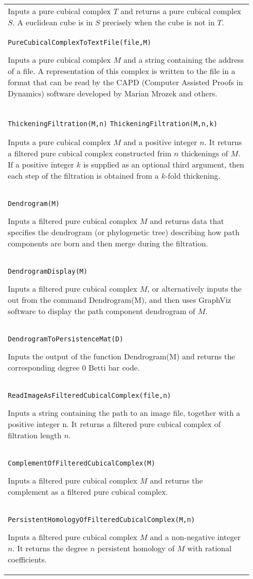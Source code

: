 \documentclass[a4paper,11pt]{report}
\begin{document}
{\begin{center}
\begin{tabular}{|l|}
 Inputs a pure cubical complex $T$ and returns a pure cubical complex $S$. A euclidean cube is in $S$ precisely when the cube is not in $T$. \\
 \index{PureCubicalComplexToTextFile} \texttt{PureCubicalComplexToTextFile(file,M)} 

 Inputs a pure cubical complex $M$ and a string containing the address of a file. A representation of this
complex is written to the file in a format that can be read by the CAPD
(Computer Assisted Proofs in Dynamics) software developed by Marian Mrozek and
others. \\
 \index{ThickeningFiltration} \texttt{ThickeningFiltration(M,n)} \texttt{ThickeningFiltration(M,n,k)} 

 Inputs a pure cubical complex $M$ and a positive integer $n$. It returns a filtered pure cubical complex constructed frim $n$ thickenings of $M$. If a positive integer $k$ is supplied as an optional third argument, then each step of the filtration is
obtained from a $k$-fold thickening. \\
 \index{Dendrogram} \texttt{Dendrogram(M)} 

 Inputs a filtered pure cubical complex $M$ and returns data that specifies the dendrogram (or phylogenetic tree)
describing how path components are born and then merge during the filtration. \\
 \index{DendrogramDisplay} \texttt{DendrogramDisplay(M)} 

 Inputs a filtered pure cubical complex $M$, or alternatively inputs the out from the command Dendrogram(M), and then
uses GraphViz software to display the path component dendrogram of $M$. \\
 \index{DendrogramToPersistenceMat} \texttt{DendrogramToPersistenceMat(D)} 

 Inputs the output of the function Dendrogram(M) and returns the corresponding
degree 0 Betti bar code. \\
 \index{ReadImageAsFilteredCubicalComplex} \texttt{ReadImageAsFilteredCubicalComplex(file,n)} 

 Inputs a string containing the path to an image file, together with a positive
integer n. It returns a filtered pure cubical complex of filtration length $n$. \\
 \index{ComplementOfFilteredCubicalComplex} \texttt{ComplementOfFilteredCubicalComplex(M)} 

 Inputs a filtered pure cubical complex $M$ and returns the complement as a filtered pure cubical complex. \\
 \index{PersistentHomologyOfFilteredCubicalComplex} \texttt{PersistentHomologyOfFilteredCubicalComplex(M,n)} 

 Inputs a filtered pure cubical complex $M$ and a non-negative integer $n$. It returns the degree $n$ persistent homology of $ M$ with rational coefficients. \\
\end{tabular}\\[2mm]
\end{center}

 }
\end{document}
